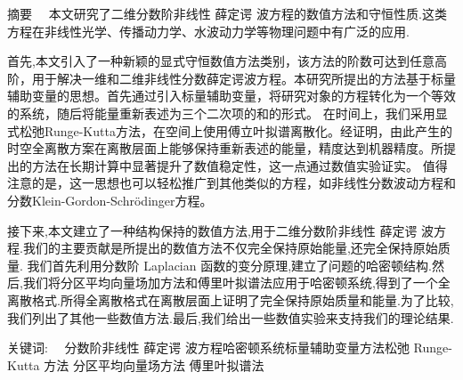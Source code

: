 
\begin{ChineseAbstract}[副教授]%
\item {\heiti 摘要\ \ }
本文研究了二维分数阶非线性 薛定谔 波方程的数值方法和守恒性质.这类方程在非线性光学、传播动力学、水波动力学等物理问题中有广泛的应用.

首先,本文引入了一种新颖的显式守恒数值方法类别，该方法的阶数可达到任意高阶，用于解决一维和二维非线性分数薛定谔波方程。本研究所提出的方法基于标量辅助变量的思想。首先通过引入标量辅助变量，将研究对象的方程转化为一个等效的系统，随后将能量重新表述为三个二次项的和的形式。
在时间上，我们采用显式松弛Runge-Kutta方法，在空间上使用傅立叶拟谱离散化。经证明，由此产生的时空全离散方案在离散层面上能够保持重新表述的能量，精度达到机器精度。所提出的方法在长期计算中显著提升了数值稳定性，这一点通过数值实验证实。
值得注意的是，这一思想也可以轻松推广到其他类似的方程，如非线性分数波动方程和分数Klein-Gordon-Schr{\"o}dinger方程。

接下来,本文建立了一种结构保持的数值方法,用于二维分数阶非线性 薛定谔 波方程.我们的主要贡献是所提出的数值方法不仅完全保持原始能量,还完全保持原始质量.
我们首先利用分数阶 Laplacian 函数的变分原理,建立了问题的哈密顿结构.然后,我们将分区平均向量场加方法和傅里叶拟谱法应用于哈密顿系统,得到了一个全离散格式.所得全离散格式在离散层面上证明了完全保持原始质量和能量.为了比较,我们列出了其他一些数值方法.最后,我们给出一些数值实验来支持我们的理论结果.

\item {\heiti 关键词:\ \ } 分数阶非线性 薛定谔 波方程\qquad 哈密顿系统\qquad 标量辅助变量方法\qquad 松弛 Runge-Kutta 方法 \qquad 分区平均向量场方法 \qquad 傅里叶拟谱法
\end{ChineseAbstract}
